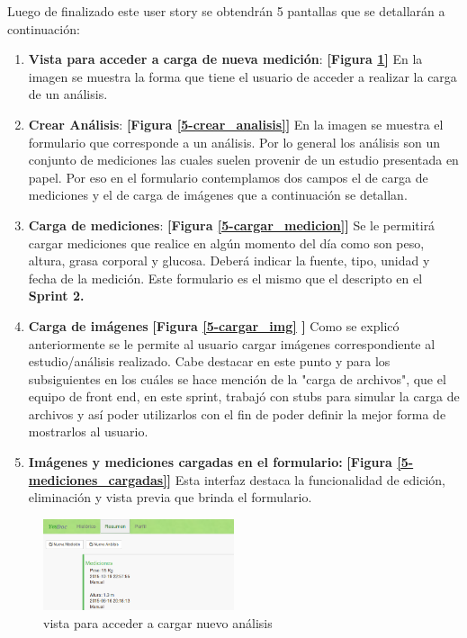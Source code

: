 \documentclass[a4paper,12pt]{article}
\begin{document}
Luego de finalizado este user story se obtendrán 5 pantallas que se detallarán a continuación:
\begin{enumerate}
	\item \textbf{Vista para acceder a carga de nueva medición}: \textbf{[Figura \ref{5-boton_nuevo_analisis}]} En la imagen se muestra la forma que tiene el usuario de acceder  a realizar la carga de un análisis.
    	\item \textbf{Crear Análisis}: \textbf{[Figura \ref{5-crear_analisis}]} En la imagen se muestra el formulario que corresponde a un análisis. Por lo general los análisis son un conjunto de mediciones las cuales suelen provenir de un estudio presentada en papel. Por eso en el formulario contemplamos dos campos el de carga de mediciones y el de carga de imágenes que a continuación se detallan.
        	\item \textbf{Carga de mediciones}: \textbf{[Figura \ref{5-cargar_medicion}]} Se le permitirá cargar mediciones que realice en algún momento del día como son peso, altura, grasa corporal y glucosa. Deberá indicar la fuente, tipo, unidad y fecha de la medición. Este formulario es el mismo que el descripto en el\textbf{ Sprint 2.}
    \item \textbf{Carga de imágenes}  \textbf{[Figura  \ref{5-cargar_img} ]} Como se explicó anteriormente se le permite al usuario cargar imágenes correspondiente al estudio/análisis realizado. Cabe destacar en este punto y para los subsiguientes en los cuáles se hace mención de la "carga de archivos",  que el equipo de front end, en este sprint, trabajó con stubs para simular la carga de archivos y así poder utilizarlos con el fin de poder definir la mejor forma de mostrarlos al usuario.

    \item \textbf{Imágenes y mediciones cargadas en el formulario:}  \textbf{[Figura \ref{5-mediciones_cargadas}]} Esta interfaz destaca la funcionalidad de edición, eliminación y vista previa que brinda el formulario.

\end{enumerate}

    
    \begin{figure}[h]
        \centering
        \includegraphics[width=0.5\textwidth]{img/5-boton_nuevo_analisis}
        \caption{vista para acceder a cargar nuevo análisis}
		\label{5-boton_nuevo_analisis}
    \end{figure}
    
\end{document}
